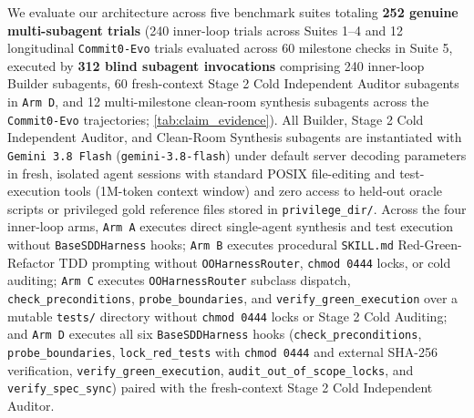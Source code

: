 \documentclass[11pt,a4paper,copyright]{google}
\begin{document}
We evaluate our architecture across five benchmark suites totaling \textbf{252 genuine multi-subagent trials} (240 inner-loop trials across Suites 1--4 and 12 longitudinal \texttt{Commit0-Evo} trials evaluated across 60 milestone checks in Suite 5, executed by \textbf{312 blind subagent invocations} comprising 240 inner-loop Builder subagents, 60 fresh-context Stage 2 Cold Independent Auditor subagents in \texttt{Arm D}, and 12 multi-milestone clean-room synthesis subagents across the \texttt{Commit0-Evo} trajectories; \cref{tab:claim_evidence}). All Builder, Stage 2 Cold Independent Auditor, and Clean-Room Synthesis subagents are instantiated with \texttt{Gemini 3.8 Flash} (\texttt{gemini-3.8-flash}) under default server decoding parameters in fresh, isolated agent sessions with standard POSIX file-editing and test-execution tools (1M-token context window) and zero access to held-out oracle scripts or privileged gold reference files stored in \texttt{privilege\_dir/}. Across the four inner-loop arms, \texttt{Arm A} executes direct single-agent synthesis and test execution without \texttt{BaseSDDHarness} hooks; \texttt{Arm B} executes procedural \texttt{SKILL.md} Red-Green-Refactor TDD prompting without \texttt{OOHarnessRouter}, \texttt{chmod 0444} locks, or cold auditing; \texttt{Arm C} executes \texttt{OOHarnessRouter} subclass dispatch, \texttt{check\_preconditions}, \texttt{probe\_boundaries}, and \texttt{verify\_green\_execution} over a mutable \texttt{tests/} directory without \texttt{chmod 0444} locks or Stage 2 Cold Auditing; and \texttt{Arm D} executes all six \texttt{BaseSDDHarness} hooks (\texttt{check\_preconditions}, \texttt{probe\_boundaries}, \texttt{lock\_red\_tests} with \texttt{chmod 0444} and external SHA-256 verification, \texttt{verify\_green\_execution}, \texttt{audit\_out\_of\_scope\_locks}, and \texttt{verify\_spec\_sync}) paired with the fresh-context Stage 2 Cold Independent Auditor.
\end{document}
